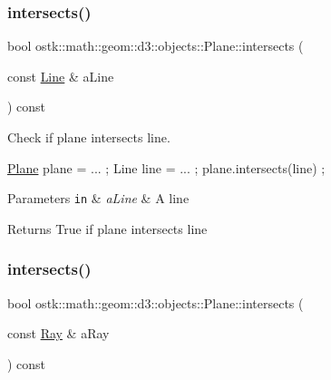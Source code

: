 \subsubsection{\texorpdfstring{intersects()}{intersects()}\hspace{0.1cm}{\footnotesize\ttfamily [3/5]}}
{\footnotesize\ttfamily bool ostk\+::math\+::geom\+::d3\+::objects\+::\+Plane\+::intersects (\begin{DoxyParamCaption}\item[{const \hyperlink{classostk_1_1math_1_1geom_1_1d3_1_1objects_1_1_line}{Line} \&}]{a\+Line }\end{DoxyParamCaption}) const}



Check if plane intersects line. 


\begin{DoxyCode}
\hyperlink{classostk_1_1math_1_1geom_1_1d3_1_1objects_1_1_plane_ac66c2a3b3d9d7cd1fd507123091bb38f}{Plane} plane = ... ;
Line line = ... ;
plane.intersects(line) ;
\end{DoxyCode}



\begin{DoxyParams}[1]{Parameters}
\mbox{\tt in}  & {\em a\+Line} & A line \\
\hline
\end{DoxyParams}
\begin{DoxyReturn}{Returns}
True if plane intersects line 
\end{DoxyReturn}
\mbox{\label{classostk_1_1math_1_1geom_1_1d3_1_1objects_1_1_plane_af1e179dece2fbba1482fdd9a98fc58ea}} 
\subsubsection{\texorpdfstring{intersects()}{intersects()}\hspace{0.1cm}{\footnotesize\ttfamily [4/5]}}
{\footnotesize\ttfamily bool ostk\+::math\+::geom\+::d3\+::objects\+::\+Plane\+::intersects (\begin{DoxyParamCaption}\item[{const \hyperlink{classostk_1_1math_1_1geom_1_1d3_1_1objects_1_1_ray}{Ray} \&}]{a\+Ray }\end{DoxyParamCaption}) const}



